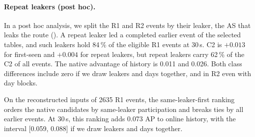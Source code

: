 \paragraph{Repeat leakers (post hoc).}
In a post hoc analysis, we split the R1 and R2 events by their leaker, the AS that leaks the route ().
A repeat leaker led a completed earlier event of the selected tables, and such leakers hold 84\,\% of the eligible R1 events at 30\,s.
C2 is $+0.013$ for first-seen and $+0.004$ for repeat leakers, but repeat leakers carry 62\,\% of the C2 of all events.
The native advantage of history is 0.011 and 0.026.
Both class differences include zero if we draw leakers and days together, and in R2 even with day blocks.

On the reconstructed inputs of \num{2635} R1 events, the same-leaker-first ranking orders the native candidates by same-leaker participation and breaks ties by all earlier events.
At 30\,s, this ranking adds 0.073 AP to online history, with the interval [0.059, 0.088] if we draw leakers and days together.

